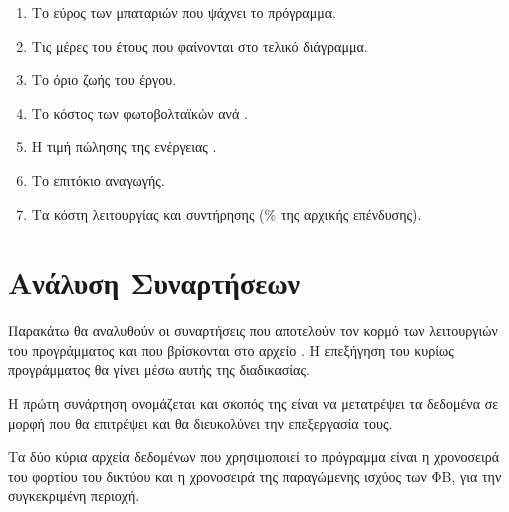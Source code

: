 \documentclass[12pt]{report}
\begin{document}
\begin{enumerate}[label=\roman*]
				\item Το εύρος των μπαταριών που ψάχνει το πρόγραμμα.
				\item Τις μέρες του έτους που φαίνονται στο τελικό διάγραμμα.
				\item Το όριο ζωής του έργου.
				\item Το κόστος των φωτοβολταϊκών ανά {}.
				\item Η τιμή πώλησης της ενέργειας {}.
				\item Το επιτόκιο αναγωγής.
				\item Τα κόστη λειτουργίας και συντήρησης (\% της αρχικής επένδυσης).
\end{enumerate}

\section{Ανάλυση Συναρτήσεων}
Παρακάτω θα αναλυθούν οι συναρτήσεις που αποτελούν τον κορμό των λειτουργιών του προγράμματος και που βρίσκονται
στο αρχείο {}. Η επεξήγηση του κυρίως προγράμματος {} θα γίνει μέσω αυτής της διαδικασίας.

Η πρώτη συνάρτηση ονομάζεται {} και σκοπός της είναι να μετατρέψει τα δεδομένα
σε μορφή που θα επιτρέψει και θα διευκολύνει την επεξεργασία τους.

Τα δύο κύρια αρχεία δεδομένων που χρησιμοποιεί το πρόγραμμα είναι η χρονοσειρά του φορτίου του δικτύου και η 
χρονοσειρά της παραγώμενης ισχύος των ΦΒ, για την συγκεκριμένη περιοχή. 
\end{document}
